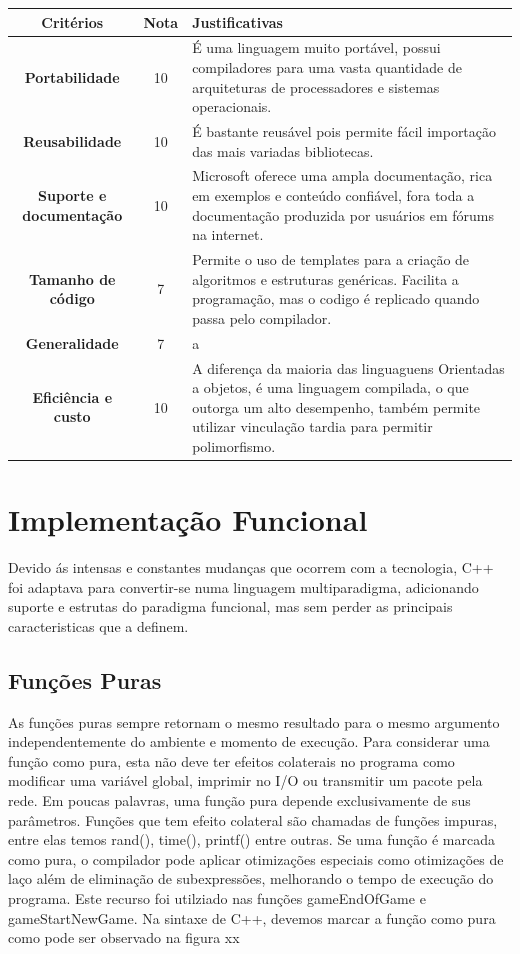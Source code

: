 \documentclass[rel_mlp]{iiufrgs}
\begin{document}
 \begin{center}
\begin{tabular}{ |c|c|p{80mm} }
\hline
	\textbf{Critérios} & \textbf{Nota} & \textbf{Justificativas} \\
\hline
\textbf{Portabilidade} & 10 & É uma linguagem muito portável, possui compiladores para uma vasta quantidade de arquiteturas de processadores e sistemas operacionais. \\
\textbf{Reusabilidade} & 10 & É bastante reusável pois permite fácil importação das mais variadas bibliotecas. \\
\textbf{Suporte e documentação} & 10 & Microsoft oferece uma ampla documentação, rica em exemplos e conteúdo confiável, fora toda a documentação produzida por usuários em fórums na internet. \\
\textbf{Tamanho de código} & 7 & Permite o uso de templates para a criação de algoritmos e estruturas genéricas. Facilita a programação, mas o codigo é replicado quando passa pelo compilador. \\
\textbf{Generalidade} & 7 & a \\
\textbf{Eficiência e custo} & 10 & A diferença da maioria das linguaguens Orientadas a objetos, é uma linguagem compilada, o que outorga um alto desempenho, também permite utilizar vinculação tardia para permitir polimorfismo. \\
\hline
\end{tabular}
\end{center}

\chapter{ Implementação Funcional} \label{Implementação Funcional} 

Devido ás intensas e constantes mudanças que ocorrem com a tecnologia, C++ foi adaptava para convertir-se numa linguagem multiparadigma, adicionando suporte e estrutas do paradigma funcional, mas sem perder as principais caracteristicas que a definem. 

 \section{Funções Puras}
	As funções puras sempre retornam o mesmo resultado para o mesmo argumento independentemente do ambiente e momento de execução. Para considerar uma função como pura, esta não deve ter efeitos colaterais no programa como modificar uma variável global, imprimir no I/O ou transmitir um pacote pela rede. Em poucas palavras, uma função pura depende exclusivamente de sus parâmetros.
	Funções que tem efeito colateral são chamadas de funções impuras, entre elas temos rand(), time(), printf() entre outras.
	Se uma função é marcada como pura, o compilador pode aplicar otimizações especiais como otimizações de laço além de eliminação de subexpressões, melhorando o tempo de execução do programa.
	Este recurso foi utilziado nas funções gameEndOfGame e gameStartNewGame. Na sintaxe de C++, devemos marcar a função como pura como pode ser observado na figura xx 
	
\end{document}
